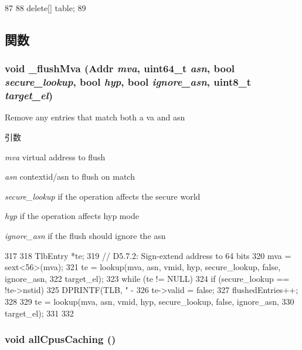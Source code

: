 \begin{DoxyCode}
87 {
88     delete[] table;
89 }
\end{DoxyCode}


\subsection{関数}
\hypertarget{classArmISA_1_1TLB_ab44854fd690d81090e18a5a7ba3850be}{
\subsubsection[{\_\-flushMva}]{\setlength{\rightskip}{0pt plus 5cm}void \_\-flushMva ({\bf Addr} {\em mva}, \/  uint64\_\-t {\em asn}, \/  bool {\em secure\_\-lookup}, \/  bool {\em hyp}, \/  bool {\em ignore\_\-asn}, \/  uint8\_\-t {\em target\_\-el})}}
\label{classArmISA_1_1TLB_ab44854fd690d81090e18a5a7ba3850be}
Remove any entries that match both a va and asn 
\begin{DoxyParams}{引数}
\item[{\em mva}]virtual address to flush \item[{\em asn}]contextid/asn to flush on match \item[{\em secure\_\-lookup}]if the operation affects the secure world \item[{\em hyp}]if the operation affects hyp mode \item[{\em ignore\_\-asn}]if the flush should ignore the asn \end{DoxyParams}



\begin{DoxyCode}
317 {
318     TlbEntry *te;
319     // D5.7.2: Sign-extend address to 64 bits
320     mva = sext<56>(mva);
321     te = lookup(mva, asn, vmid, hyp, secure_lookup, false, ignore_asn,
322                 target_el);
323     while (te != NULL) {
324         if (secure_lookup == !te->nstid) {
325             DPRINTF(TLB, " -  %
326             te->valid = false;
327             flushedEntries++;
328         }
329         te = lookup(mva, asn, vmid, hyp, secure_lookup, false, ignore_asn,
330                     target_el);
331     }
332 }
\end{DoxyCode}
\hypertarget{classArmISA_1_1TLB_a5fd1cb3fb8887f4bd6c1f982a23cc026}{
\subsubsection[{allCpusCaching}]{\setlength{\rightskip}{0pt plus 5cm}void allCpusCaching ()}}
\label{classArmISA_1_1TLB_a5fd1cb3fb8887f4bd6c1f982a23cc026}



